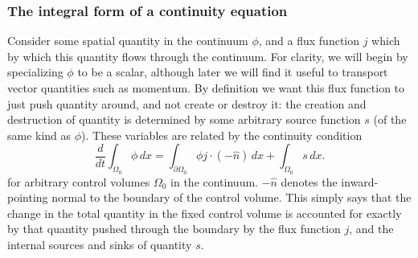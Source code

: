 \documentclass[11pt,a4paper]{memoir}
\begin{document}
\subsubsection{The integral form of a continuity equation}
Consider some spatial quantity in the continuum $\phi$, and a flux function $j$ which by which
this quantity flows through the continuum. For clarity, we will begin by specializing $\phi$ to be a scalar, although later we will find it useful to
transport vector quantities such as momentum. By definition we want this flux function to just push quantity around, and not create or destroy it:
the creation and destruction of quantity is determined by some arbitrary source function $s$ (of the same kind as $\phi$). These variables are related by the continuity
condition
\begin{equation}\label{continuity_equation}
    \frac{d}{dt} \int_{\Omega_0} \phi\,dx = \int_{\partial\Omega_0} \phi j\cdot (-\hat{n})\,dx + \int_{\Omega_0} s\,dx.
\end{equation}
for arbitrary control volumes $\Omega_0$ in the continuum. $-\hat{n}$ denotes the inward-pointing normal to the boundary of the control volume. This simply says that the change in the total quantity in the fixed control volume
is accounted for exactly by that quantity pushed through the boundary by the flux function $j$, and the internal sources and sinks of quantity $s$.
\end{document}
